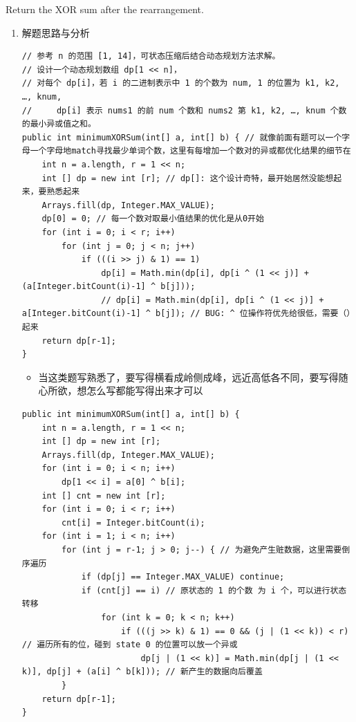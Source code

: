 \documentclass[9pt, b5paaper]{book}
\begin{document}
Return the XOR sum after the rearrangement.
\begin{enumerate}
\item 解题思路与分析
\label{sec-1-4-6-1}
\begin{verbatim}
// 参考 n 的范围 [1, 14]，可状态压缩后结合动态规划方法求解。
// 设计一个动态规划数组 dp[1 << n]，
// 对每个 dp[i]，若 i 的二进制表示中 1 的个数为 num, 1 的位置为 k1, k2, …, knum,
//     dp[i] 表示 nums1 的前 num 个数和 nums2 第 k1, k2, …, knum 个数的最小异或值之和。
public int minimumXORSum(int[] a, int[] b) { // 就像前面有题可以一个字母一个字母地match寻找最少单词个数，这里有每增加一个数对的异或都优化结果的细节在
    int n = a.length, r = 1 << n;
    int [] dp = new int [r]; // dp[]: 这个设计奇特，最开始居然没能想起来，要熟悉起来
    Arrays.fill(dp, Integer.MAX_VALUE);
    dp[0] = 0; // 每一个数对取最小值结果的优化是从0开始
    for (int i = 0; i < r; i++) 
        for (int j = 0; j < n; j++) 
            if (((i >> j) & 1) == 1)
                dp[i] = Math.min(dp[i], dp[i ^ (1 << j)] + (a[Integer.bitCount(i)-1] ^ b[j])); 
                // dp[i] = Math.min(dp[i], dp[i ^ (1 << j)] + a[Integer.bitCount(i)-1] ^ b[j]); // BUG: ^ 位操作符优先给很低，需要（）起来
    return dp[r-1];
}
\end{verbatim}
\begin{itemize}
\item 当这类题写熟悉了，要写得横看成岭侧成峰，远近高低各不同，要写得随心所欲，想怎么写都能写得出来才可以
\end{itemize}
\begin{verbatim}
public int minimumXORSum(int[] a, int[] b) {
    int n = a.length, r = 1 << n;
    int [] dp = new int [r]; 
    Arrays.fill(dp, Integer.MAX_VALUE);
    for (int i = 0; i < n; i++) 
        dp[1 << i] = a[0] ^ b[i];
    int [] cnt = new int [r];
    for (int i = 0; i < r; i++)
        cnt[i] = Integer.bitCount(i);
    for (int i = 1; i < n; i++) 
        for (int j = r-1; j > 0; j--) { // 为避免产生赃数据，这里需要倒序遍历
            if (dp[j] == Integer.MAX_VALUE) continue;
            if (cnt[j] == i) // 原状态的 1 的个数 为 i 个，可以进行状态转移
                for (int k = 0; k < n; k++) 
                    if (((j >> k) & 1) == 0 && (j | (1 << k)) < r) // 遍历所有的位，碰到 state 0 的位置可以放一个异或
                        dp[j | (1 << k)] = Math.min(dp[j | (1 << k)], dp[j] + (a[i] ^ b[k])); // 新产生的数据向后覆盖
        }
    return dp[r-1];
}
\end{verbatim}
\end{enumerate}
\end{document}
